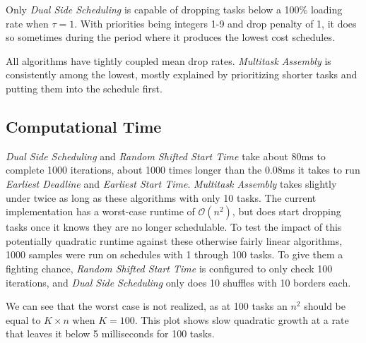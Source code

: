 \documentclass[journal,12pt,onecolumn,draftclsnofoot,]{IEEEtran}
\begin{document}
\begin{figure}[h]
	\centering
	{}
\end{figure}

Only \emph{Dual Side Scheduling} is capable of dropping tasks below a 100\% loading rate when $\tau = 1$. With priorities being integers 1-9 and drop penalty of 1, it does so sometimes during the period where it produces the lowest cost schedules.

All algorithms have tightly coupled mean drop rates. \emph{Multitask Assembly} is consistently among the lowest, mostly explained by prioritizing shorter tasks and putting them into the schedule first.

\subsection{Computational Time}

\begin{figure}[h]
	\centering
	{}
\end{figure}

\begin{figure}[h]
	\centering
	{}
\end{figure}

\emph{Dual Side Scheduling} and \emph{Random Shifted Start Time} take about 80ms to complete 1000 iterations, about 1000 times longer than the 0.08ms it takes to run \emph{Earliest Deadline} and \emph{Earliest Start Time}.
\emph{Multitask Assembly} takes slightly under twice as long as these algorithms with only 10 tasks. The current implementation has a worst-case runtime of $\mathcal{O}(n^2)$, but does start dropping tasks once it knows they are no longer schedulable.
To test the impact of this potentially quadratic runtime against these otherwise fairly linear algorithms, 1000 samples were run on schedules with 1 through 100 tasks.
To give them a fighting chance, \emph{Random Shifted Start Time} is configured to only check 100 iterations, and \emph{Dual Side Scheduling} only does 10 shuffles with 10 borders each.

\begin{figure}[h]
	\centering
	{}
\end{figure}

We can see that the worst case is not realized, as at 100 tasks an $n^2$ should be equal to $K \times n$ when $K = 100$.
This plot shows slow quadratic growth at a rate that leaves it below 5 milliseconds for 100 tasks.
\end{document}
